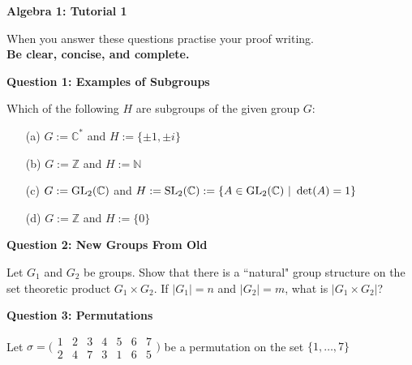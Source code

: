 \documentclass[11pt,twoside, a4paper]{report}
\theoremstyle{plain}
\theoremstyle{definition}
\begin{document}
\begin{center}
 \noindent\makebox[\linewidth]{\rule{14cm}{1.5pt}} 
{\bf Algebra 1: Tutorial 1 }
 \noindent\makebox[\linewidth]{\rule{14cm}{1.5pt}}  
 \noindent\makebox[\linewidth]{\rule{14cm}{3pt}}
\end{center}

\noindent When you answer these questions practise your proof writing.\\
  {\bf Be clear, concise, and complete.}
  
  
\begin{center}
{\bf Question 1: Examples of Subgroups}
\end{center}


Which of the following $H$ are subgroups of the given group $G$: 

\begin{itemize}
\item[(a)] $G:= \mathbb{C}^{*}$ and $H:=\{ \pm 1, \pm i\}$ 

\item[(b)] $G:= \mathbb{Z}$ and $H:=\mathbb{N}$

\item[(c)] $G:=\textnormal{GL}_{2}(\mathbb{C})$ and $H:=\textnormal{SL}_{2}(\mathbb{C}):=\{A \in \textnormal{GL}_{2}(\mathbb{C}) \ | \ \det(A)=1 \}$

\item[(d)] $G:= \mathbb{Z}$ and $H:=\{0\}$
\end{itemize}

\begin{center}
{\bf Question 2: New Groups From Old}
\end{center}


Let $G_{1}$ and $G_{2}$ be groups. Show that there is a ``natural" group structure on the set theoretic product $G_{1}\times G_{2}$. If $|G_{1}|=n$ and $|G_{2}|=m$, what is $|G_{1}\times G_{2}|$?

\begin{center}
{\bf Question 3: Permutations}
\end{center}


Let $ \sigma = \bigl(\begin{smallmatrix}
    1 & 2 & 3 & 4 & 5 & 6 & 7 \\
    2 & 4 & 7 & 3 & 1 & 6 & 5
  \end{smallmatrix}\bigr)$ be a permutation on the set $\{1, \dots , 7\}$ 
  
\end{document}
